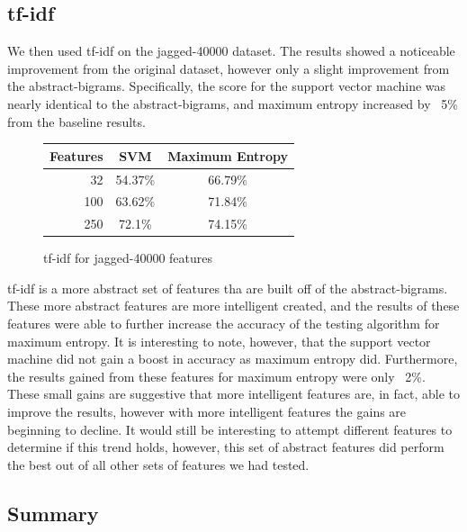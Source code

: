 \subsection{tf-idf}
We then used tf-idf on the jagged-40000 dataset.  The results showed a noticeable improvement from the original dataset, however only a slight improvement from the abstract-bigrams.  Specifically, the score for the support vector machine was nearly identical to the abstract-bigrams, and maximum entropy increased by ~5\% from the baseline results.

\begin{figure}[!h]
\begin{center}
\caption{tf-idf for jagged-40000 features}
\begin{tabular}{| r | c | c |}
\hline
Features & SVM & Maximum Entropy \\ \hline
32 & 54.37\% & 66.79\% \\ \hline
100 & 63.62\% & 71.84\% \\ \hline
250 & 72.1\% & 74.15\% \\ \hline
\end{tabular}
\end{center}
\end{figure}

tf-idf is a more abstract set of features tha are built off of the abstract-bigrams.  These more abstract features are more intelligent created, and the results of these features were able to further increase the accuracy of the testing algorithm for maximum entropy.  It is interesting to note, however, that the support vector machine did not gain a boost in accuracy as maximum entropy did.  Furthermore, the results gained from these features for maximum entropy were only ~2\%.  These small gains are suggestive that more intelligent features are, in fact, able to improve the results, however with more intelligent features the gains are beginning to decline.  It would still be interesting to attempt different features to determine if this trend holds, however, this set of abstract features did perform the best out of all other sets of features we had tested.

\subsection{Summary}


